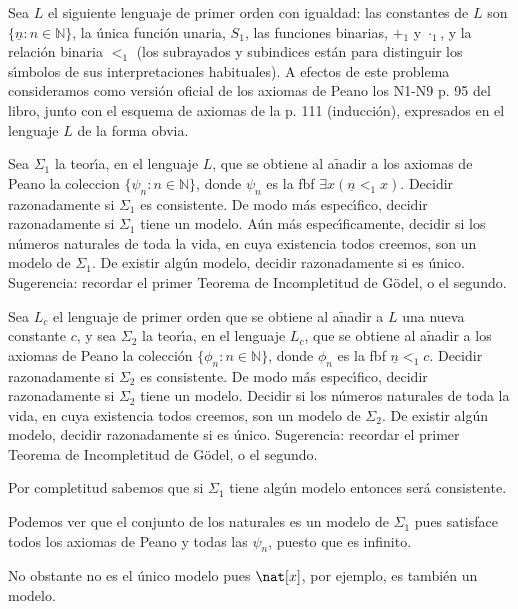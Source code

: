 \begin{problem}
Sea  $L$  el siguiente lenguaje de primer orden  con igualdad: las constantes de $L$ son
$\{\underline{n}: n\in\mathbb{N}\}$, la \'unica funci\'on unaria, $S_1$, las funciones binarias,
$+_1$ y $\cdot_1$, y la relaci\'on binaria $<_1$ (los subrayados y subindices est\'an para
distinguir los s\'{\i}mbolos de sus interpretaciones habituales). A efectos de este problema
consideramos como versi\'on oficial de los axiomas de Peano los N1-N9 p. 95 del libro, junto con el esquema
de axiomas de la p. 111 (inducci\'on), expresados en el lenguaje $L$ de la forma
obvia.

\ppart Sea $\Sigma_1$ la teor\'{\i}a,
 en el lenguaje $L$, que se obtiene al a$\operatorname{\tilde{n}}$adir a los
axiomas de Peano la coleccion $\{ \psi_n: n\in\mathbb{N}\}$, donde
$\psi_n$ es la fbf $\exists x (\underline{n} <_1 x )$.
 Decidir razonadamente si
$\Sigma_1$ es consistente. De modo m\'as espec\'{\i}fico, decidir razonadamente si $\Sigma_1$ tiene un modelo.  A\'un m\'as espec\'{\i}ficamente, decidir si los n\'umeros naturales
de toda la vida, en cuya existencia todos creemos,  son un modelo de $\Sigma_1$.
De existir alg\'un modelo, decidir razonadamente si es \'unico.
Sugerencia: recordar el primer Teorema de Incompletitud de G\"odel, o el segundo.

\ppart Sea $L_c$ el lenguaje de primer orden que se obtiene al a$\operatorname{\tilde{n}}$adir
a $L$ una nueva constante $c$, y sea
$\Sigma_2$ la teor\'{\i}a,
 en el lenguaje $L_c$, que se obtiene al a$\operatorname{\tilde{n}}$adir a los
axiomas de Peano la colección $\{ \phi_n: n\in\mathbb{N}\}$, donde
$\phi_n$ es la fbf $\underline{n} <_1 c$.
Decidir razonadamente si
$\Sigma_2$ es consistente. De modo m\'as espec\'{\i}fico, decidir razonadamente si $\Sigma_2$ tiene un modelo.  Decidir si los n\'umeros naturales
de toda la vida, en cuya existencia todos creemos,  son un modelo de $\Sigma_2$.
De existir alg\'un modelo, decidir razonadamente si es \'unico.
Sugerencia: recordar el primer Teorema de Incompletitud de G\"odel, o el segundo.
\solution
\spart

Por completitud sabemos que si $Σ_1$ tiene algún modelo entonces será consistente.

Podemos ver que el conjunto de los naturales es un modelo de $Σ_1$ pues satisface todos los axiomas de Peano y todas las $\psi_n$, puesto que es infinito.

No obstante no es el único modelo pues $\nat[x]$, por ejemplo, es también un modelo.


\end{problem}
